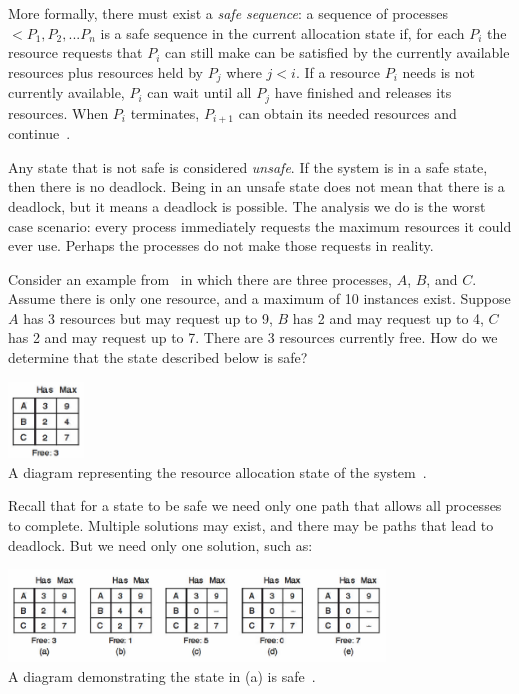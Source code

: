 \documentclass[a4paper]{report}
\begin{document}
More formally, there must exist a \textit{safe sequence}: a sequence of processes $<P_{1}, P_{2}, ... P_{n}$ is a safe sequence in the current allocation state if, for each $P_{i}$ the resource requests that $P_{i}$ can still make can be satisfied by the currently available resources plus resources held by $P_{j}$ where $j < i$. If a resource $P_{i}$ needs is not currently available, $P_{i}$ can wait until all $P_{j}$ have finished and releases its resources. When $P_{i}$ terminates, $P_{i+1}$ can obtain its needed resources and continue~\cite{osc}.

Any state that is not safe is considered \textit{unsafe}. If the system is in a safe state, then there is no deadlock. Being in an unsafe state does not mean that there is a deadlock, but it means a deadlock is possible. The analysis we do is the worst case scenario: every process immediately requests the maximum resources it could ever use. Perhaps the processes do not make those requests in reality.

Consider an example from~\cite{mos} in which there are three processes, $A$, $B$, and $C$. Assume there is only one resource, and a maximum of 10 instances exist. Suppose $A$ has 3 resources but may request up to 9, $B$ has 2 and may request up to 4, $C$ has 2 and may request up to 7. There are 3 resources currently free. How do we determine that the state described below is safe?

\begin{center}
	\includegraphics[width=0.15\textwidth]{images/safe-state-initial.png}\\
	A diagram representing the resource allocation state of the system~\cite{mos}.
\end{center}

Recall that for a state to be safe we need only one path that allows all processes to complete. Multiple solutions may exist, and there may be paths that lead to deadlock. But we need only one solution, such as:

\begin{center}
	\includegraphics[width=0.75\textwidth]{images/safe-state.png}\\
	A diagram demonstrating the state in (a) is safe~\cite{mos}.
\end{center}
\end{document}
